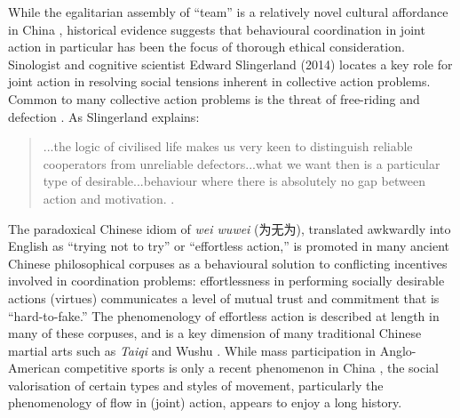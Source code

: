 \begin{CJK}{UTF8}{gbsn}
While the egalitarian assembly of ``team'' is a relatively novel cultural affordance in China \citep[see][]{Morris2004}, historical evidence suggests that behavioural coordination in joint action in particular has been the focus of thorough ethical consideration.  Sinologist and cognitive scientist Edward Slingerland (2014) locates a key role for joint action in resolving social tensions inherent in collective action problems.  Common to many collective action problems is the threat of free-riding and defection \citep{Cosmides2013}.  As Slingerland explains:

\begin{quote}
   ...the logic of civilised life makes us very keen to distinguish reliable cooperators from unreliable defectors...what we want then is a particular type of desirable...behaviour where there is absolutely no gap between action and motivation.  \citep[192]{Slingerland2014}.
\end{quote}

The paradoxical Chinese idiom of \textit{wei wuwei} (为无为), translated awkwardly into English as ``trying not to try'' or ``effortless action,'' is promoted in many ancient Chinese philosophical corpuses as a behavioural solution to conflicting incentives involved in coordination problems: effortlessness in performing socially desirable actions (virtues) communicates a level of mutual trust and commitment that is ``hard-to-fake.''  The phenomenology of effortless action is described at length in many of these corpuses, and is a key dimension of many traditional Chinese martial arts such as \textit{Taiqi} and Wushu \citep{Morris1998}.  While mass participation in Anglo-American competitive sports is only a recent phenomenon in China \citep{Brownell2008}, the social valorisation of certain types and styles of movement, particularly the phenomenology of flow in (joint) action, appears to enjoy a long history.


\end{CJK}
